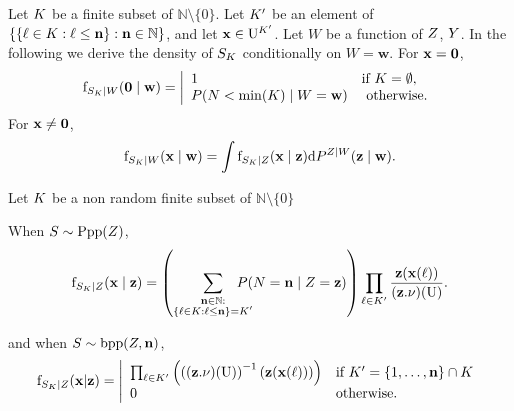 Let $K$ be  a finite subset of $\mathbb{N}\setminus\{0\}$. Let   $K'$ be an element of $\{\{\ell\in K:\ell\leq\mathbf{n}\}:\mathbf{n}\in\mathbb{N}\}$, and let  $\mathbf{x}\in\mathrm{U}^{K'}$. Let $W$ be a function of $Z$, $Y$.
In the following we derive the density of $S_K$ conditionally on $W=\mathbf{w}$.
For $\mathbf{x}=\mathbf{0}$,
\begin{equation}\mathrm{f}_{S_K\mid W}(\mathbf{0}\mid\mathbf{w})=\left|\begin{array}{ll}1&\text{if }K=\emptyset,\\
P(N<\min(K)\mid W=\mathbf{w})&\text{ otherwise.}
\end{array}\right.\end{equation}
For $\mathbf{x}\neq\mathbf{0}$,
\begin{equation}\label{eq:iduhifduewer}
\mathrm{f}_{S_K\mid W}(\mathbf{x}\mid\mathbf{w})=
\int \mathrm{f}_{S_K\mid Z}(\mathbf{x}\mid\mathbf{z}) \mathrm{d} P^{Z\mid W}(\mathbf{z}\mid\mathbf{w}).
\end{equation}
\begin{example}
\label{example:2.4}

Let $K$ be  a non random  finite subset of $\mathbb{N}\setminus\{0\}$

When $S\sim \mathrm{Ppp}(Z)$,
\begin{equation}\label{eq:sgiushdiuh}
\density_{\Sample_K\mid \Desvar}(\position\mid\mathbf{\desvar})=
\left(\sum_{\substack{\samplesize\in\mathbb{N}:\\\{\ell\in\Sampleindex:\ell\leq\samplesize\}=\Sampleindex'}}\!\!\!\!\!\!\!\! P(\Samplesize=\samplesize\mid\Desvar=\desvar)\right)\prod_{\ell\in\Sampleindex'}\frac{\desvar(\position(\ell))}{(\desvar.\dominantU)(\Pop)}.
\end{equation}


and when $S\sim \mathrm{bpp}(Z,\mathbf{n})$,
\begin{equation}\label{eq:sgiushdiuh2}
\mathrm{f}_{S_{K}\mid Z}(\mathbf{x}|\mathbf{z})=\left|\begin{array}{ll}
\prod_{\ell\in K'} \left(\left((\mathbf{z}.\nu)(\mathrm{U})\right)^{-1}\left(\mathbf{z}(\mathbf{x}(\ell))\right)\right)&\text{if }K'=\{1,\ldots,\mathbf{n}\}\cap K\\
0&\text{otherwise.}
\end{array}\right.\end{equation}






\end{example}

